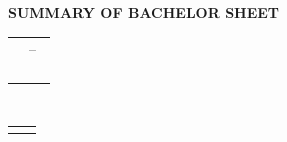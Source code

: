 {{\newpage
	
\begin{center}\MakeUppercase{\Large\bfseries{Summary of BACHELOR sheet\phantom{ř}}}\end{center} 
\vspace{1cm}
\noindent\begin{tabularx}{\textwidth}{| Y | C{4.5cm} | C{4.5cm} |}
	\hline
	\Z {} &  &  \\ \hline
	\Z \parbox[c]{3cm}{\centering{}} &   \\ \hline
	\Z {} &  &  \\ \hline
	\Z {} &   \\ \hline
	\Z {} & \sout{} &  \\ \hline 
	\Z \parbox[c]{3cm}{\centering{}} &   \\ \hline
\end{tabularx}

\vspace{1cm}
\noindent\begin{tabularx}{\textwidth}{|@{}Y@{}|C{2.2cm}||@{}Y@{}|C{1cm}||@{}Y@{}|C{1cm}|}
	\hline
	\Z {} & \fakultaEN &\parbox[c]{3cm}{\centering{}} & \ZkatedraCZ &  \parbox[c]{3cm}{\centering{}} & \Rokodevzdani \\ \hline
\end{tabularx}

\vspace{1cm}

\noindent\begin{tabularx}{\textwidth}{|@{}Y@{}|C{2.2cm}||@{}Y@{}|C{1cm}||@{}Y@{}|C{1cm}|}
	\hline
	\Z {} & \Pcelkem &\parbox[c]{2cm}{\centering{}} & \Ptext &  \parbox[c]{3cm}{\centering{}} & \Pgraphic \\ \hline
\end{tabularx}

\vspace{1cm}
\noindent\begin{tabularx}{\textwidth}{| Y |m{10cm} |}
	\hline
	\Z \parbox[c]{4cm}{\centering{}} & \abstrEN \\ \hline   %
	\Z {} & \klicovaEN \\ \hline
\end{tabularx}
}
	\clearpage
	\tableofcontents		%
	
}
